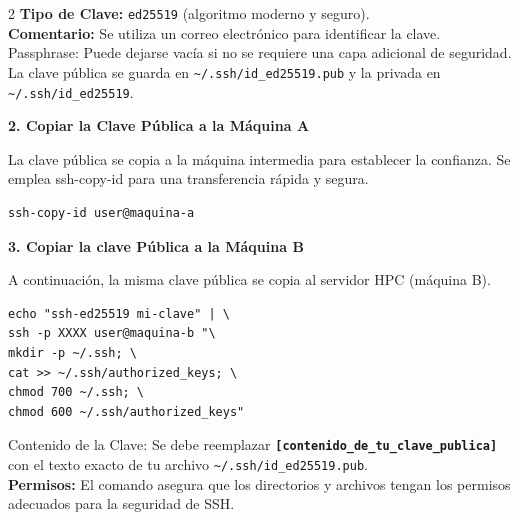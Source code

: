 \begin{multicols*}{2}
\noindent \textbf{Tipo de Clave:} \texttt{ed25519} (algoritmo moderno y seguro).\\
\textbf{Comentario:} Se utiliza un correo electrónico para identificar la clave.\\
Passphrase: Puede dejarse vacía si no se requiere una capa adicional de seguridad.\\

\noindent La clave pública se guarda en \texttt{\~{}/.ssh/id\_ed25519.pub} y la privada en \texttt{\~{}/.ssh/id\_ed25519}.

\vspace{\baselineskip}

\noindent\textbf{2. Copiar la Clave Pública a la Máquina A}

La clave pública se copia a la máquina intermedia para establecer la confianza. Se emplea ssh-copy-id para una transferencia rápida y segura.

\begin{center}
\begin{minipage}{0.95\linewidth}
\begin{verbatim}
ssh-copy-id user@maquina-a
\end{verbatim}
\end{minipage}
\end{center}

\columnbreak

\noindent\textbf{3. Copiar la clave Pública a la Máquina B}

A continuación, la misma clave pública se copia al servidor HPC (máquina B).

\begin{center}
\begin{minipage}{0.95\linewidth}
\small
\begin{verbatim}
echo "ssh-ed25519 mi-clave" | \
ssh -p XXXX user@maquina-b "\
mkdir -p ~/.ssh; \
cat >> ~/.ssh/authorized_keys; \
chmod 700 ~/.ssh; \
chmod 600 ~/.ssh/authorized_keys"
\end{verbatim}
\end{minipage}
\end{center}

\noindent Contenido de la Clave: Se debe reemplazar \textbf{\texttt{[contenido\_de\_tu\_clave\_publica]}} con el texto exacto de tu archivo \texttt{\~{}/.ssh/id\_ed25519.pub}.\\
\textbf{Permisos:} El comando asegura que los directorios y archivos tengan los permisos adecuados para la seguridad de SSH.


\end{multicols*}
